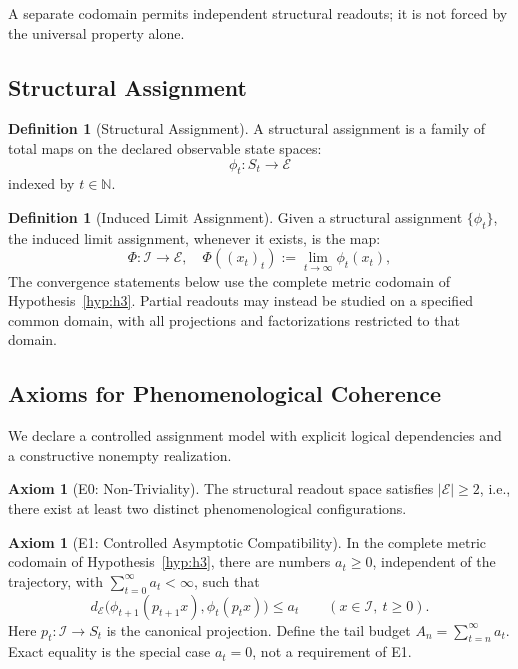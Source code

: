 \documentclass[11pt,a4paper]{article}
\theoremstyle{plain}
\theoremstyle{definition}
\newtheorem{definition}[theorem]{Definition}
\newtheorem{axiom}[theorem]{Axiom}
\theoremstyle{remark}
\begin{document}
A separate codomain permits independent structural readouts; it is not forced by the universal property alone.

\subsection{Structural Assignment}

\begin{definition}[Structural Assignment]\label{def:phenassign}
A structural assignment is a family of total maps on the declared observable state spaces:
\begin{equation}
    \phi_t: S_t \to \mathcal{E}
\end{equation}
indexed by $t \in \mathbb{N}$.
\end{definition}

\begin{definition}[Induced Limit Assignment]\label{def:limitassign}
Given a structural assignment $\{\phi_t\}$, the induced limit assignment, whenever it exists, is the map:
\begin{equation}
    \Phi: \mathcal{I} \to \mathcal{E}, \quad \Phi((x_t)_t) := \lim_{t \to \infty} \phi_t(x_t),
\end{equation}
The convergence statements below use the complete metric codomain of Hypothesis~\ref{hyp:h3}. Partial readouts may instead be studied on a specified common domain, with all projections and factorizations restricted to that domain.
\end{definition}



\subsection{Axioms for Phenomenological Coherence}

We declare a controlled assignment model with explicit logical dependencies and a constructive nonempty realization.

\begin{axiom}[E0: Non-Triviality]\label{ax:e0}
The structural readout space satisfies $|\mathcal{E}| \geq 2$, i.e., there exist at least two distinct phenomenological configurations.
\end{axiom}

\begin{axiom}[E1: Controlled Asymptotic Compatibility]\label{ax:e1}
In the complete metric codomain of Hypothesis~\ref{hyp:h3}, there are numbers $a_t\geq0$, independent of the trajectory, with $\sum_{t=0}^{\infty}a_t<\infty$, such that
\[
d_{\mathcal E}\bigl(\phi_{t+1}(p_{t+1}x),\phi_t(p_tx)\bigr)\leq a_t
\qquad(x\in\mathcal I,\ t\geq0).
\]
Here $p_t:\mathcal I\to S_t$ is the canonical projection. Define the tail budget $A_n=\sum_{t=n}^{\infty}a_t$. Exact equality is the special case $a_t=0$, not a requirement of E1.
\end{axiom}
\end{document}

